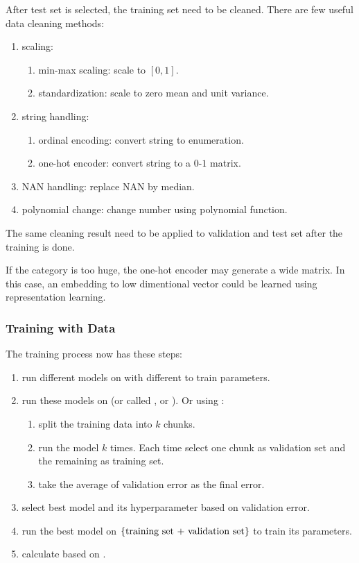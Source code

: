 After test set is selected, the training set need to be cleaned. There are few useful data cleaning methods:
\begin{enumerate}
	\item scaling:
		\begin{enumerate}
			\item min-max scaling: scale to $[0,1]$.
			\item standardization: scale to zero mean and unit variance.
		\end{enumerate}
	\item string handling:
		\begin{enumerate}
			\item ordinal encoding: convert string to enumeration.
			\item one-hot encoder: convert string to a $0$-$1$ matrix.
		\end{enumerate}
	\item NAN handling: replace NAN by median.
	\item polynomial change: change number using polynomial function.
\end{enumerate}

The same cleaning result need to be applied to validation and test set after the training is done.

If the category is too huge, the one-hot encoder may generate a wide matrix. In this case, an embedding to low dimentional vector could be learned using representation learning.

\subsubsection{Training with Data}

The training process now has these steps:
\begin{enumerate}
	\item run different models on  with different  to train parameters.
	\item run these models on  (or called , or ). Or using :
        \begin{enumerate}
            \item split the training data into $k$ chunks.
            \item run the model $k$ times. Each time select one chunk as validation set and the remaining as training set.
            \item take the average of validation error as the final error.
        \end{enumerate}
	\item select best model and its hyperparameter based on validation error.
	\item run the best model on $\set{\text{training set + validation set}}$ to train its parameters.
	\item calculate  based on .
\end{enumerate}




